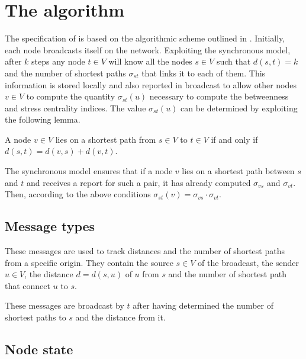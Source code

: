 
\section{The \deccen{} algorithm}
\label{sec:deccen}

The specification of \deccen{} is based on the algorithmic scheme outlined in \cite{lehmann2003}. Initially, each node broadcasts itself on the network. Exploiting the synchronous model, after $k$ steps any node $t \in V$ will know all the nodes $s \in V$ such that $d(s,t) = k$ and the number of shortest paths  $\sigma_{st}$ that links it to each of them. This information is stored locally and also reported in broadcast to allow other nodes $v \in V$ to compute the quantity $\sigma_{st}(u)$ necessary to compute the betweenness and stress centrality indices. The value $\sigma_{st}(u)$ can be determined by exploiting the following lemma.

\begin{lemma}
A node $v \in V$ lies on a shortest path from $s \in V$ to $t \in V$ if and only if $d(s,t) = d(v,s) + d(v,t)$.
\end{lemma}

The synchronous model ensures that if a node $v$ lies on a shortest path between $s$ and $t$ and receives a report for such a pair, it has already computed $\sigma_{vs}$ and $\sigma_{vt}$. Then, according to the above conditions $\sigma_{st}(v) = \sigma_{vs} \cdot \sigma_{vt}$.

\subsection{Message types}
\begin{description}[leftmargin=0cm]
\item[\mdiscargs{s}{u}{d}] These messages are used to track distances and the number of shortest paths from a specific origin. They contain the source $s \in V$ of the broadcast, the sender $u \in V$, the distance $d = d(s,u)$ of $u$ from $s$ and the number of shortest path that connect $u$ to $s$.

\item[\mdecrepargs{s}{t}] These messages are broadcast by $t$ after having determined the number of shortest paths to $s$ and the distance from it.
\end{description}

\subsection{Node state}

